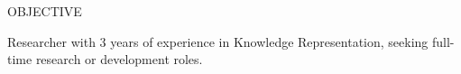 %

\begin{rSection}{OBJECTIVE}

Researcher with 3 years of experience in Knowledge Representation, seeking full-time research or development roles.

\end{rSection}
